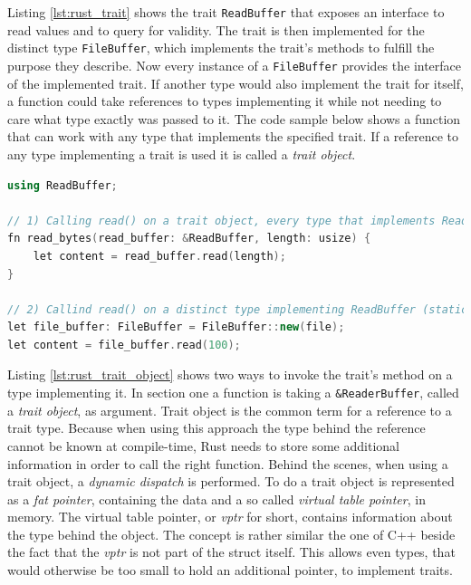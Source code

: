\noindent
Listing \ref{lst:rust_trait} shows the trait \texttt{ReadBuffer} that exposes an interface to read values and to query for validity. The trait is then implemented for the distinct type \texttt{FileBuffer}, which implements the trait's methods to fulfill the purpose they describe. Now every instance of a \texttt{FileBuffer} provides the interface of the implemented trait. If another type would also implement the trait for itself, a function could take references to types implementing it while not needing to care what type exactly was passed to it. The code sample below shows a function that can work with any type that implements the specified trait. If a reference to any type implementing a trait is used it is called a \textit{trait object}.\\

\begin{lstlisting}[caption={A function, taking a trait object}, label={lst:rust_trait_object}, language=C++]
using ReadBuffer;

// 1) Calling read() on a trait object, every type that implements ReadBuffer (dynamic dispatch)
fn read_bytes(read_buffer: &ReadBuffer, length: usize) {
	let content = read_buffer.read(length);
}

// 2) Callind read() on a distinct type implementing ReadBuffer (static dispatch)
let file_buffer: FileBuffer = FileBuffer::new(file);
let content = file_buffer.read(100);
\end{lstlisting}

\noindent
Listing \ref{lst:rust_trait_object} shows two ways to invoke the trait's method on a type implementing it. In section one a function is taking a \texttt{\&ReaderBuffer}, called a \textit{trait object}, as argument. Trait object is the common term for a reference to a trait type. Because when using this approach the type behind the reference cannot be known at compile-time, Rust needs to store some additional information in order to call the right function. Behind the scenes, when using a trait object, a \textit{dynamic dispatch} is performed. To do a trait object is represented as a \textit{fat pointer}, containing the data and a so called \textit{virtual table pointer}, in memory. The virtual table pointer, or \textit{vptr} for short, contains information about the type behind the object. The concept is rather similar the one of C++ beside the fact that the \textit{vptr} is not part of the struct itself. This allows even types, that would otherwise be too small to hold an additional pointer, to implement traits.\\

